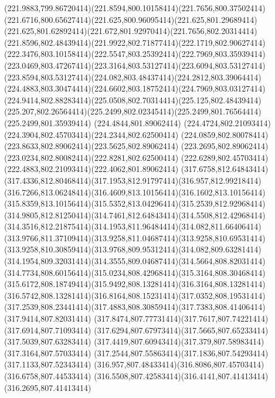 {{	\curveto(221.9883,799.86720414)(221.8594,800.10158414)(221.7656,800.37502414)
	\curveto(221.6716,800.65627414)(221.625,800.96095414)(221.625,801.29689414)
	\curveto(221.625,801.62892414)(221.672,801.92970414)(221.7656,802.20314414)
	\curveto(221.8596,802.48439414)(221.9922,802.71877414)(222.1719,802.90627414)
	\curveto(222.3476,803.10158414)(222.5547,803.25392414)(222.7969,803.35939414)
	\curveto(223.0469,803.47267414)(223.3164,803.53127414)(223.6094,803.53127414)
	\curveto(223.8594,803.53127414)(224.082,803.48437414)(224.2812,803.39064414)
	\curveto(224.4883,803.30474414)(224.6602,803.18752414)(224.7969,803.03127414)
	\curveto(224.9414,802.88283414)(225.0508,802.70314414)(225.125,802.48439414)
	\curveto(225.207,802.26564414)(225.2499,802.02345414)(225.2499,801.76564414)
	\lineto(225.2499,801.35939414)
	\closepath
	\moveto(224.4844,801.89062414)
	\curveto(224.4724,802.21093414)(224.3904,802.45703414)(224.2344,802.62500414)
	\curveto(224.0859,802.80078414)(223.8633,802.89062414)(223.5625,802.89062414)
	\curveto(223.2695,802.89062414)(223.0234,802.80082414)(222.8281,802.62500414)
	\curveto(222.6289,802.45703414)(222.4883,802.21093414)(222.4062,801.89062414)
	\closepath
	\moveto(317.6758,812.64843414)
	\curveto(317.4336,812.80468414)(317.1953,812.91797414)(316.957,812.99218414)
	\curveto(316.7266,813.06248414)(316.4609,813.10156414)(316.1602,813.10156414)
	\curveto(315.8359,813.10156414)(315.5352,813.04296414)(315.2539,812.92968414)
	\curveto(314.9805,812.81250414)(314.7461,812.64843414)(314.5508,812.42968414)
	\curveto(314.3516,812.21875414)(314.1953,811.96484414)(314.082,811.66406414)
	\curveto(313.9766,811.37109414)(313.9258,811.04687414)(313.9258,810.69531414)
	\curveto(313.9258,810.30859414)(313.9768,809.95312414)(314.082,809.63281414)
	\curveto(314.1954,809.32031414)(314.3555,809.04687414)(314.5664,808.82031414)
	\curveto(314.7734,808.60156414)(315.0234,808.42968414)(315.3164,808.30468414)
	\curveto(315.6172,808.18749414)(315.9492,808.13281414)(316.3164,808.13281414)
	\curveto(316.5742,808.13281414)(316.8164,808.15231414)(317.0352,808.19531414)
	\curveto(317.2539,808.23441414)(317.4883,808.30859414)(317.7383,808.41406414)
	\lineto(317.9414,807.82031414)
	\curveto(317.8474,807.77731414)(317.7617,807.74221414)(317.6914,807.71093414)
	\curveto(317.6294,807.67973414)(317.5665,807.65233414)(317.5039,807.63283414)
	\curveto(317.4419,807.60943414)(317.379,807.58983414)(317.3164,807.57033414)
	\curveto(317.2544,807.55863414)(317.1836,807.54293414)(317.1133,807.52343414)
	\curveto(316.957,807.48433414)(316.8086,807.45703414)(316.6758,807.44533414)
	\curveto(316.5508,807.42583414)(316.4141,807.41413414)(316.2695,807.41413414)
}}
